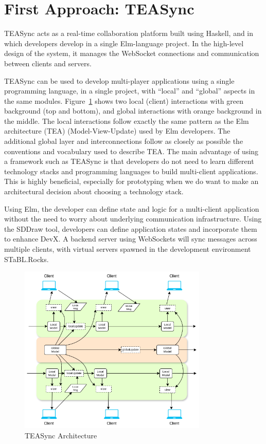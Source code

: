 \section{First Approach: TEASync}
\label{section:first_approach}

TEASync acts as a real-time collaboration platform built using Haskell,
and in which developers develop in a single Elm-language project. In the high-level design of the system, it manages the WebSocket connections and communication between clients and servers.

TEASync can be used to develop multi-player applications using a single programming language,
in a single project, with ``local'' and ``global'' aspects in the same modules.
Figure~\ref{fig:teasync-architecture} shows two local (client) interactions with green background (top and bottom),
and global interactions with orange background in the middle.
The local interactions follow exactly the same pattern as the Elm architecture (TEA) (Model-View-Update) used by Elm developers.
The additional global layer and interconnections follow as closely as possible the conventions and vocabulary used to describe TEA.
The main advantage of using a framework such as TEASync is that developers do not need to learn different technology stacks and programming languages to build multi-client applications. This is highly beneficial, especially for prototyping when we do want to make an architectural decision about choosing a technology stack.

Using Elm, the developer can define state and logic for a multi-client application without the need to worry about underlying communication infrastructure. Using the SDDraw tool, developers can define application states and incorporate them to enhance DevX. A backend server using WebSockets\cite{websockets} will sync messages across multiple clients, with virtual servers  spawned in the development environment STaBL.Rocks.


\begin{figure}[ht]
    \centering
    \includegraphics[width=0.8\textwidth]{diagrams/TEASyncAppArchitecture.png}
    \caption{TEASync Architecture}
    \label{fig:teasync-architecture}
\end{figure}

